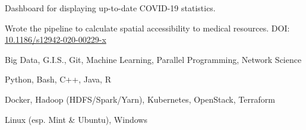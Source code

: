 \documentclass{acmresume}
\begin{document}
    \begin{titemize}
    	\item Dashboard for displaying up-to-date COVID-19 statistics.
    	\item Wrote the pipeline to calculate spatial accessibility to medical resources. DOI: \href{https://doi.org/10.1186/s12942-020-00229-x}{10.1186/s12942-020-00229-x}
    \end{titemize}
    
    
    
    
    \vspace*{-0.5cm}
        \begin{description}[topsep=0pt,itemsep=0pt]
        	 Big Data, G.I.S., Git, Machine Learning, Parallel Programming, Network Science
        	
        	 Python, Bash, C++, Java, R
        	
        	 Docker, Hadoop (HDFS/Spark/Yarn), Kubernetes, OpenStack, Terraform
        	
        	 Linux (esp. Mint \& Ubuntu), Windows
        \end{description}

	
\end{document}
